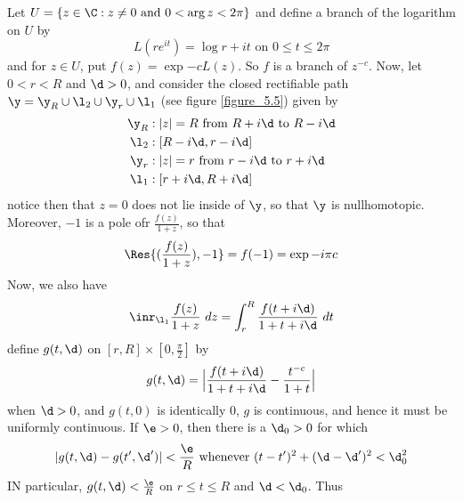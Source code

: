 \begin{example}
\begin{enumerate}
           Let $U=\{z \in \C : z \neq 0 \text{ and } 0<\arg{z}<2\pi\}$ and
           define a branch of the logarithm on $U$ by
           \begin{equation*}
               L(re^{it})=\log{r}+it \text{ on } 0 \leq t \leq 2\pi
           \end{equation*}
           and for $z \in U$, put  $f(z)=\exp{-cL(z)}$. So $f$ is a branch of
           $z^{-c}$. Now, let $0<r<R$ and  $\d>0$, and consider the closed
           rectifiable path $\y=\y_R \cup \l_2 \cup \y_r \cup \l_1$ (see figure
           \ref{figure_5.5}) given by
           \begin{align*}
               \y_R  &:  |z|=R \text{ from } R+i\d \text{ to } R-i\d \\
               \l_2 &:  [R-i\d,r-i\d]   \\
               \y_r &:  |z|=r \text{ from } r-i\d \text{ to } r+i\d \\
               \l_1 &:  [r+i\d,R+i\d]
           \end{align*}
           notice then that $z=0$ does not lie inside of $\y$, so that  $\y$ is
           nullhomotopic. Moreover,  $-1$ is a pole ofr  $\frac{f(z)}{1+z}$, so
           that
           \begin{equation*}
               \Res{(\frac{f(z)}{1+z}),-1}=f(-1)=\exp{-i\pi{c}}
           \end{equation*}
           Now, we also have
           \begin{equation*}
               \inr_{\l_1}{\frac{f(z)}{1+z} \ dz}=
               \int_r^R{\frac{f(t+i\d)}{1+t+i\d} \ dt}
           \end{equation*}
           define $g(t,\d)$ on $[r,R] \times [0,\frac{\pi}{2}]$ by
           \begin{equation*}
               g(t,\d)=\Big{|} \frac{f(t+i\d)}{1+t+i\d}-\frac{t^{-c}}{1+t} \Big{|}
           \end{equation*}
           when $\d>0$, and  $g(t,0)$ is identically $0$, $g$ is continuous, and
           hence it must be uniformly continuous. If  $\e>0$, then there is a
           $\d_0>0$ for which
           \begin{equation*}
               |g(t,\d)-g(t',\d')|<\frac{\e}{R} \text{ whenever }
               (t-t')^2+(\d-\d')^2<\d_0^2
           \end{equation*}
           IN particular, $g(t,\d)<\frac{\e}{R}$ on $r \leq t \leq R$ and
           $\d<\d_0$. Thus
           \begin{equation*}

\end{equation*}
\end{enumerate}
\end{example}

